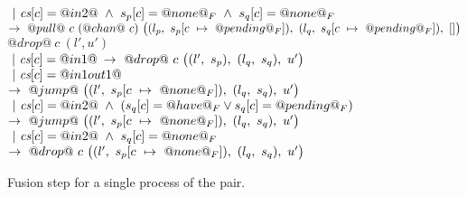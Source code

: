 \begin{figure*}
\begin{tabbing}
\> \> $~|~\cs[c]=@in2@ ~\wedge~ s_p[c]=@none@_F ~\wedge~ s_q[c]=@none@_F$ \\
\> \> $\to~@pull@~c~(@chan@~c)~
      \nextStep
        {l_p}
          {\HeapUpdateOne{c}{@pending@_F}{s_p}}
        {l_q}
          {\HeapUpdateOne{c}{@pending@_F}{s_q}}
        {[]}
  $
\> \> 
\\[1ex]

\> $@drop@~c~(l',u')$ \\
\> \> $~|~\cs[c]=@in1@$
\> \hspace{2em} $\to~@drop@~c~
      \nextStep
        {l'}
          {s_p}
        {l_q}
          {s_q}
        {u'}
      $
\>  \\

\> \> $~|~\cs[c]=@in1out1@$
\> \hspace{2em} $\to~@jump@~
      \nextStep
        {l'}
          {\HeapUpdateOne{c}{@none@_F}{s_p}}
        {l_q}
          {s_q}
        {u'}
      $
\> \\

\> \> $~|~\cs[c]=@in2@ ~\wedge~ (s_q[c]=@have@_F \vee s_q[c]=@pending@_F)$ 
\> \hspace{2em} $\to~@jump@~
      \nextStep
        {l'}
          {\HeapUpdateOne{c}{@none@_F}{s_p}}
        {l_q}
          {s_q}
        {u'}
      $
\> \\



\> \> $~|~\cs[c]=@in2@ ~\wedge~ s_q[c]=@none@_F$
\> \hspace{2em} $\to~@drop@~c~
      \nextStep
        {l'}
          {\HeapUpdateOne{c}{@none@_F}{s_p}}
        {l_q}
          {s_q}
        {u'}
      $
\> \\

\end{tabbing}

\caption{Fusion step for a single process of the pair.} 

\label{fig:Fusion:Def:Step}
\end{figure*}

